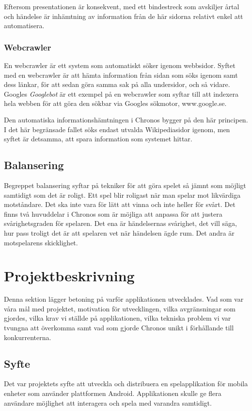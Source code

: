 \documentclass[a4paper, 11pt]{article}
\begin{document}
Eftersom presentationen är konsekvent, med ett bindestreck som avskiljer årtal och händelse är inhämtning av information från de här sidorna relativt enkel att automatisera.

\subsubsection{Webcrawler}
En webcrawler är ett system som automatiskt söker igenom webbsidor. Syftet med en webcrawler är att hämta information från sidan som söks igenom samt dess länkar, för att sedan göra samma sak på alla undersidor, och så vidare. Googles \textit{Googlebot} är ett exempel på en webcrawler som syftar till att indexera hela webben för att göra den sökbar via Googles sökmotor, www.google.se.

Den automatiska informationshämtningen i Chronos bygger på den här principen. I det här begränsade fallet söks endast utvalda Wikipediasidor igenom, men syftet är detsamma, att spara information som systemet hittar. 

\subsection{Balansering}
Begreppet balansering syftar på tekniker för att göra spelet så jämnt som möjligt samtidigt som det är roligt. Ett spel blir roligast när man spelar mot likvärdiga motståndare. Det ska inte vara för lätt att vinna och inte heller för svårt. Det finns två huvuddelar i Chronos som är möjliga att anpassa för att justera svårighetsgraden för spelaren. Det ena är händelsernas svårighet, det vill säga, hur pass troligt det är att spelaren vet när händelsen ägde rum. Det andra är motspelarens skicklighet.

\section{Projektbeskrivning}
Denna sektion lägger betoning på varför applikationen utvecklades. Vad som var våra mål med projektet, motivation för utvecklingen, vilka avgränsningar som gjordes, vilka krav vi ställde på applikationen, vilka tekniska problem vi var tvungna att överkomma samt vad som gjorde Chronos unikt i förhållande till konkurrenterna.

\subsection{Syfte}
Det var projektets syfte att utveckla och distribuera en spelapplikation för mobila enheter som använder plattformen Android. Applikationen skulle ge flera användare möjlighet att interagera och spela med varandra samtidigt.
\end{document}
